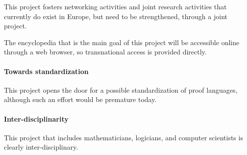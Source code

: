 This project fosters networking activities and joint research activities that
currently do exist in Europe, but need to be strengthened, through a
joint project.

The encyclopedia that is the main goal of this project will be
accessible online through a web browser, so transnational access is
provided directly.

\paragraph{Towards standardization}
This project opens the door for a possible standardization of proof
languages, although such an effort would be premature today.

\paragraph{Inter-disciplinarity}
This project that includes mathematicians, logicians, and computer
scientists is clearly inter-disciplinary.

 
